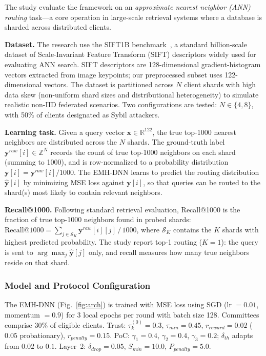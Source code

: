 \documentclass[conference]{IEEEtran}
\begin{document}
The study evaluate the framework on an \emph{approximate nearest neighbor (ANN) routing} task---a core operation in large-scale retrieval systems where a database is sharded across distributed clients.

\textbf{Dataset.} The research use the SIFT1B benchmark~\cite{jegou2008pq}, a standard billion-scale dataset of Scale-Invariant Feature Transform (SIFT) descriptors widely used for evaluating ANN search. SIFT descriptors are 128-dimensional gradient-histogram vectors extracted from image keypoints; our preprocessed subset uses 122-dimensional vectors. The dataset is partitioned across $N$ client shards with high data skew (non-uniform shard sizes and distributional heterogeneity) to simulate realistic non-IID federated scenarios. Two configurations are tested: $N \in \{4, 8\}$, with 50\% of clients designated as Sybil attackers.

\textbf{Learning task.} Given a query vector $\mathbf{x} \in \mathbb{R}^{122}$, the true top-1000 nearest neighbors are distributed across the $N$ shards. The ground-truth label $\mathbf{y}^{raw}[i] \in \mathbb{Z}^N$ records the count of true top-1000 neighbors on each shard (summing to 1000), and is row-normalized to a probability distribution $\mathbf{y}[i] = \mathbf{y}^{raw}[i] / 1000$. The EMH-DNN learns to predict the routing distribution $\hat{\mathbf{y}}[i]$ by minimizing MSE loss against $\mathbf{y}[i]$, so that queries can be routed to the shard(s) most likely to contain relevant neighbors.

\textbf{Recall@1000.} Following standard retrieval evaluation, Recall@1000 is the fraction of true top-1000 neighbors found in probed shards: $\text{Recall@1000} = \sum_{j \in \mathcal{S}_K} \mathbf{y}^{raw}[i][j] \,/\, 1000$, where $\mathcal{S}_K$ contains the $K$ shards with highest predicted probability. The study report top-1 routing ($K=1$): the query is sent to $\arg\max_j \hat{\mathbf{y}}[j]$ only, and recall measures how many true neighbors reside on that shard.

\subsubsection{Model and Protocol Configuration}
\label{sec:config}

The EMH-DNN (Fig.~\ref{fig:arch}) is trained with MSE loss using SGD (lr $= 0.01$, momentum $= 0.9$) for 3 local epochs per round with batch size 128. Committees comprise 30\% of eligible clients. Trust: $\tau_k^{(0)} = 0.3$, $\tau_{min} = 0.45$, $r_{reward} = 0.02$ ($0.05$ probationary), $r_{penalty} = 0.15$. PoC: $\gamma_1 = 0.4$, $\gamma_2 = 0.4$, $\gamma_3 = 0.2$; $\delta_{th}$ adapts from $0.02$ to $0.1$. Layer~2: $\delta_{drop} = 0.05$, $S_{min} = 10.0$, $P_{penalty} = 5.0$.
\end{document}
